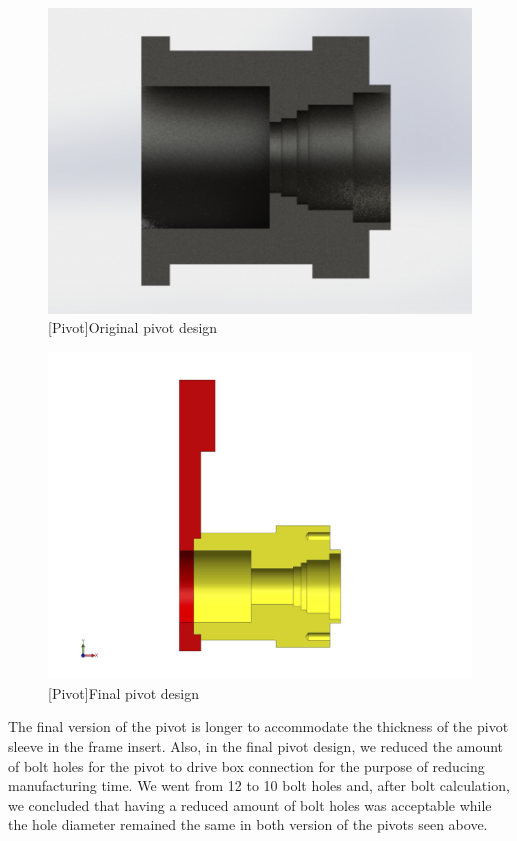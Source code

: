 \begin{figure}[htbp]
\centering
\includegraphics[height=0.3\textheight]{./images/oldpivothaft}
[Pivot]{Original pivot design}
\label{fig:pivotold}
\end{figure}
\newpage
\begin{figure}[htbp]
\centering
\includegraphics[height=0.3\textheight]{./images/finalpivot}
[Pivot]{Final pivot design}
\label{fig:pivotfinal}
\end{figure}

The final version of the pivot is longer to accommodate the thickness of the pivot sleeve in the frame insert.  Also, in the final pivot design, we reduced the amount of bolt holes for the pivot to drive box connection for the purpose of reducing manufacturing time. We went from 12 to 10 bolt holes and, after bolt calculation, we concluded that having a reduced amount of bolt holes was acceptable while the hole diameter remained the same in both version of the pivots seen above.


